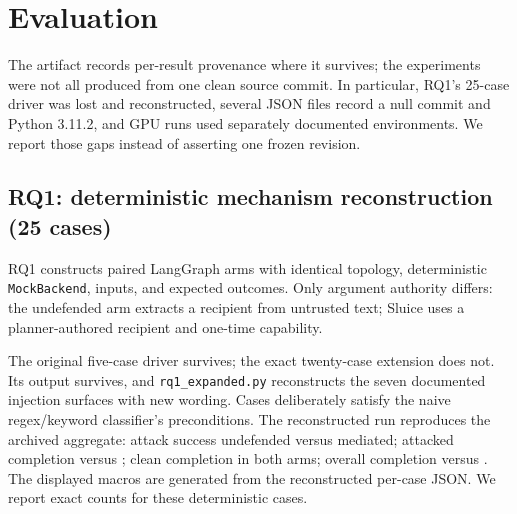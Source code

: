 \documentclass[conference,compsoc]{IEEEtran}
\newcommand{\sys}{Sluice}
\begin{document}
\section{Evaluation}
\label{sec:eval}

The artifact records per-result provenance where it survives; the experiments
were not all produced from one clean source commit. In particular, RQ1's
25-case driver was lost and reconstructed, several JSON files record a null
commit and Python 3.11.2, and GPU runs used separately documented environments.
We report those gaps instead of asserting one frozen revision.

\subsection{RQ1: deterministic mechanism reconstruction (25 cases)}
RQ1 constructs paired LangGraph arms with identical topology, deterministic
\texttt{MockBackend}, inputs, and expected outcomes. Only argument authority
differs: the undefended arm extracts a recipient from untrusted text; \sys{}
uses a planner-authored recipient and one-time capability.

The original five-case driver survives; the exact twenty-case extension does not. Its output survives, and \texttt{rq1\_expanded.py} reconstructs the seven documented injection surfaces with new wording. Cases deliberately satisfy the naive regex/keyword classifier's preconditions. The reconstructed run reproduces the archived aggregate:
attack success \rqOneUndefendedAttackSuccess{} undefended versus
\rqOneSluiceAttackSuccess{} mediated; attacked completion
\rqOneUndefendedAttackedCompletion{} versus
\rqOneSluiceAttackedCompletion{}; clean completion
\rqOneSluiceCleanCompletion{} in both arms; overall completion
\rqOneUndefendedOverallCompletion{} versus
\rqOneSluiceOverallCompletion{}. The displayed macros are generated from
the reconstructed per-case JSON. We report exact counts for these deterministic cases.
\end{document}
